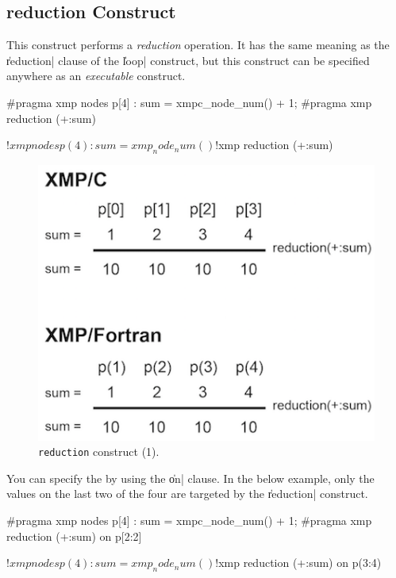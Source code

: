 \subsection{{\bf reduction} Construct}

This construct performs a {\it reduction} operation. It has the same
meaning as the \|reduction| clause of the \|loop| construct, but this
construct can be specified anywhere as an {\it executable} construct.

\begin{XCexample}
#pragma xmp nodes p[4]
  :
sum = xmpc_node_num() + 1;
#pragma xmp reduction (+:sum)
\end{XCexample}

\begin{XFexample}
!$xmp nodes p(4)
  :
sum = xmp_node_num()
!$xmp reduction (+:sum)
\end{XFexample}

\begin{figure}
  \centering
  \includegraphics[width=0.7\columnwidth]{figs/reduction.png}
  \caption{{\tt reduction} construct (1).}
\end{figure}

You can specify the {\enset} by using the \|on| clause. In the
below example, only the values on the last two of the four {\nodes} are
targeted by the \|reduction| construct.

\begin{XCexample}
#pragma xmp nodes p[4]
  :
sum = xmpc_node_num() + 1;
#pragma xmp reduction (+:sum) on p[2:2]
\end{XCexample}

\begin{XFexample}
!$xmp nodes p(4)
  :
 sum = xmp_node_num()
 !$xmp reduction (+:sum) on p(3:4)
\end{XFexample}

